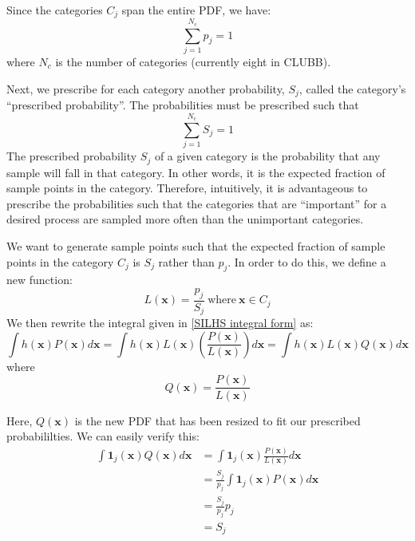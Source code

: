 \documentclass[11pt,fleqn]{article}
\begin{document}
Since the categories $C_j$ span the entire PDF, we have:
\begin{equation}
\sum_{j=1}^{N_c} p_j = 1
\end{equation}
where $N_c$ is the number of categories (currently eight in CLUBB).

Next, we prescribe for each category another probability, $S_j$, called the
category's ``prescribed probability''. The probabilities must be prescribed such
that
\begin{equation}
\sum_{j=1}^{N_c} S_j = 1
\end{equation}
The prescribed probability $S_j$ of a given category is the probability that any
sample will fall in that category. In other words, it is the expected fraction
of sample points in the category. Therefore, intuitively, it is advantageous to
prescribe the probabilities such that the categories that are ``important'' for
a desired process are sampled more often than the unimportant categories.

We want to generate sample points such that the expected fraction of sample
points in the category $C_j$ is $S_j$ rather than $p_j$. In order to do this,
we define a new function:
\begin{equation}
L(\mathbf{x}) = \frac{p_j}{S_j}\ \mathrm{where}\ \mathbf{x}\in C_j
\end{equation}
We then rewrite the integral given in \eqref{SILHS integral form} as:
\begin{equation}
\int h(\mathbf{x}) P(\mathbf{x}) d\mathbf{x} =
\int h(\mathbf{x}) L(\mathbf{x})\left(\frac{P(\mathbf{x})}{L(\mathbf{x})}
\right)d\mathbf{x} =
\int h(\mathbf{x}) L(\mathbf{x}) Q(\mathbf{x}) d\mathbf{x}
\label{SILHS integral rewrite}
\end{equation}
where
\begin{equation}
Q(\mathbf{x}) = \frac{P(\mathbf{x})}{L(\mathbf{x})}
\end{equation}

Here, $Q(\mathbf{x})$ is the new PDF that has been resized to fit our prescribed
probabililties. We can easily verify this:
\begin{align}
\int \mathbf{1}_j(\mathbf{x}) Q(\mathbf{x}) d\mathbf{x} &=
\int \mathbf{1}_j(\mathbf{x}) \frac{P(\mathbf{x})}{L(\mathbf{x})} d\mathbf{x} \\
 &= \frac{S_j}{p_j} \int \mathbf{1}_j(\mathbf{x}) P(\mathbf{x}) d\mathbf{x} \\
 &= \frac{S_j}{p_j} p_j \\
 &= S_j
\end{align}
\end{document}
